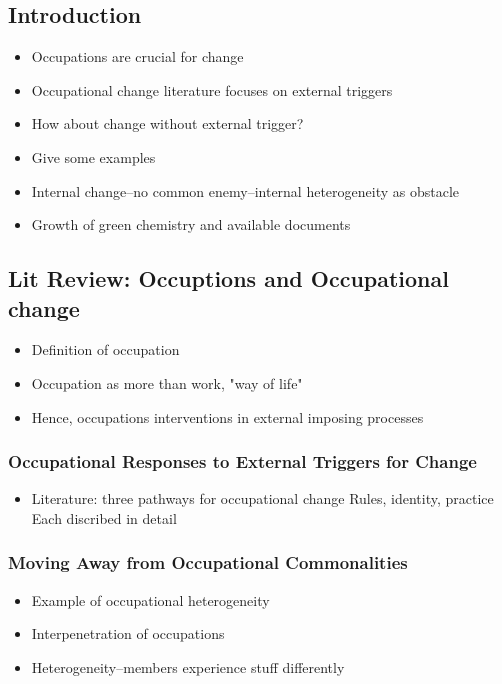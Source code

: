 \documentclass{article}
\begin{document}
	\subsection*{Introduction}
	\begin{itemize}
		\item Occupations are crucial for change
		\item Occupational change literature focuses on external triggers
		\item How about change without external trigger?
		\item Give some examples
		\item Internal change--no common enemy--internal heterogeneity as obstacle
		\item Growth of green chemistry and available documents
	\end{itemize}
	
	\subsection*{Lit Review: Occuptions and Occupational change}
	\begin{itemize}
		\item Definition of occupation
		\item Occupation as more than work, "way of life"
		\item Hence, occupations interventions in external imposing processes
	\end{itemize}
	
	\subsubsection*{Occupational Responses to External Triggers for Change}
	\begin{itemize}
		\item Literature: three pathways for occupational change
			\subitem Rules, identity, practice
			\subitem Each discribed in detail
	\end{itemize}
	
	\subsubsection*{Moving Away from Occupational Commonalities}
	\begin{itemize}
		\item Example of occupational heterogeneity
		\item Interpenetration of occupations
		\item Heterogeneity--members experience stuff differently
	\end{itemize}	
	
\end{document}
